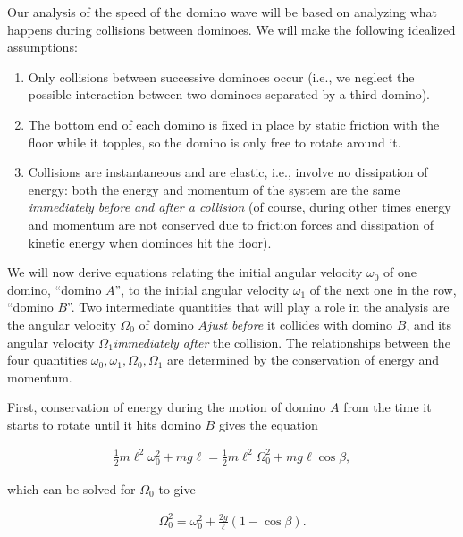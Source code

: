 \documentclass[11pt]{report}
\theoremstyle{plain}
\theoremstyle{definition}
\begin{document}
\noindent Our analysis of the speed of the domino wave will be
based on analyzing what happens during collisions
between dominoes. We will make the following idealized
assumptions:

\begin{enumerate}[label=(\roman*)]
\item Only collisions between successive dominoes occur
(i.e., we neglect the possible interaction between two
dominoes separated by a third domino).

\item The bottom end of each domino is fixed in place by
static friction with the floor while it topples, so
the domino is only free to rotate around it.

\item Collisions are instantaneous and are elastic, i.e.,
involve no dissipation of energy: both the energy and
momentum of the system are the same \emph{immediately
before and after a collision} (of course, during other
times energy and momentum are not conserved due to
friction forces and dissipation of kinetic energy when
dominoes hit the floor).
\end{enumerate}

\noindent We will now derive equations relating the initial
angular velocity $\omega_0$ of one domino, ``domino
$A$'', to the initial angular velocity $\omega_1$ of
the next one in the row, ``domino $B$''. Two
intermediate quantities that will play a role in the
analysis are the angular velocity $\Omega_0$ of domino
$A$\emph{just before} it collides with domino $B$, and its
angular velocity $\Omega_1$\emph{immediately after} the
collision. The relationships between the four
quantities $\omega_0, \omega_1, \Omega_0, \Omega_1$
are determined by the conservation of energy and
momentum.

First, conservation of energy during the motion of
domino $A$ from the time it starts to rotate until it
hits domino $B$ gives the equation

\begin{align*}
\tfrac12 m \ell^2 \omega_0^2 + mg\ell = \tfrac12 m \ell^2 \Omega_0^2 + mg\ell \cos \beta,
\end{align*}

\noindent which can be solved for $\Omega_0$ to give

\begin{equation*} \tag{25}\label{eq:dominowave-cons1}
\begin{split}
\Omega_0^2 = \omega_0^2 + \frac{2g}{\ell}(1-\cos \beta).
\end{split}
\end{equation*}
\end{document}
